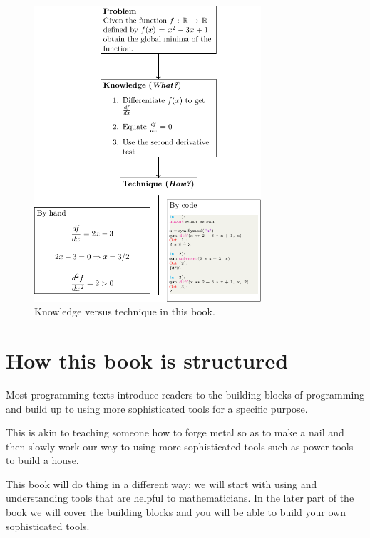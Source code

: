 \begin{figure}[htbp!]
\centering

\includegraphics[width=0.75\textwidth]{assets/knowledge_vs_technique/main.pdf}
\caption{Knowledge versus technique in this
    book.}\label{fig:knowledge_versus_technique}
\end{figure}

\section{How this book is structured}

Most programming texts introduce readers to the building blocks of
programming and build up to using more sophisticated tools for a specific
purpose.

This is akin to teaching someone how to forge metal so as to make a nail and
then slowly work our way to using more sophisticated tools such as power tools
to build a house.

This book will do thing in a different way: we will start with using and
understanding tools that are helpful to mathematicians. In the later part of the
book we will cover the building blocks and you will be able to build your own
sophisticated tools.

